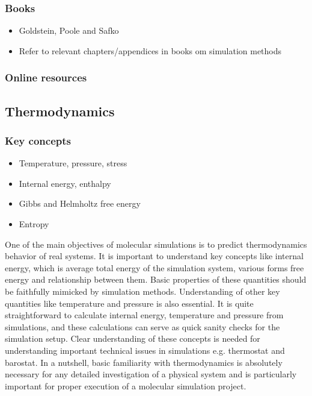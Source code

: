 \documentclass[9pt,bestpractices]{livecoms}
\begin{document}
\subsubsection{Books}
\begin{itemize}
\item Goldstein, Poole and Safko
\item Refer to relevant chapters/appendices in books om simulation methods
\end{itemize}

\subsubsection{Online resources}


\subsection{Thermodynamics}
\subsubsection{Key concepts}
\begin{itemize}
\item Temperature, pressure, stress
\item Internal energy, enthalpy
\item Gibbs and Helmholtz free energy
\item Entropy
\end{itemize}

One of the main objectives of molecular simulations is to predict thermodynamics behavior of real systems. 
It is important to understand key concepts like internal energy, which is average total energy of the simulation system, various forms free energy and relationship between them. 
Basic properties of these quantities should be faithfully mimicked by simulation methods. Understanding of other key quantities like temperature and pressure is also essential. 
It is quite straightforward to calculate internal energy, temperature and pressure from simulations, and these calculations can serve as quick sanity checks for the simulation setup. 
Clear understanding of these concepts is needed for understanding important technical issues in simulations e.g. thermostat and barostat.
In a nutshell, basic familiarity with thermodynamics is absolutely necessary for any detailed investigation of a physical system and is particularly important for proper execution of a molecular simulation project.
\end{document}
